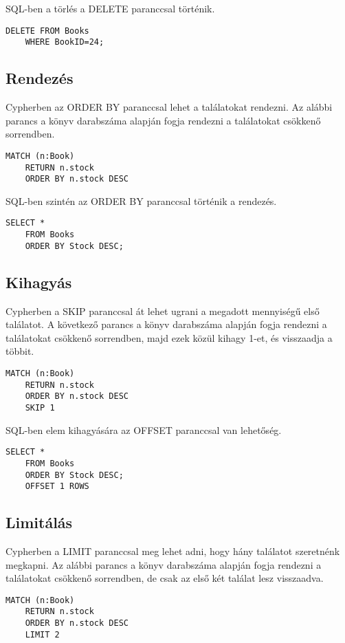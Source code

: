 \bigskip

\noindent SQL-ben a törlés a DELETE paranccsal történik.
\begin{lstlisting}[columns=fullflexible]
    DELETE FROM Books 
    WHERE BookID=24;
\end{lstlisting}

\subsection{Rendezés}
Cypherben az ORDER BY paranccsal lehet a találatokat rendezni. Az alábbi parancs a könyv darabszáma alapján fogja rendezni a találatokat csökkenő sorrendben.
\begin{lstlisting}[columns=fullflexible]
    MATCH (n:Book) 
    RETURN n.stock 
    ORDER BY n.stock DESC
\end{lstlisting}

\bigskip

\noindent SQL-ben szintén az ORDER BY paranccsal történik a rendezés.

\begin{lstlisting}[columns=fullflexible]
    SELECT * 
    FROM Books 
    ORDER BY Stock DESC;
\end{lstlisting}

\subsection{Kihagyás}
Cypherben a SKIP paranccsal át lehet ugrani a megadott mennyiségű első találatot. A következő parancs a könyv darabszáma alapján fogja rendezni a találatokat csökkenő sorrendben, majd ezek közül kihagy 1-et, és visszaadja a többit.
\begin{lstlisting}[columns=fullflexible]
    MATCH (n:Book) 
    RETURN n.stock 
    ORDER BY n.stock DESC
    SKIP 1
\end{lstlisting}

\noindent SQL-ben elem kihagyására az OFFSET paranccsal van lehetőség.

\begin{lstlisting}[columns=fullflexible]
    SELECT * 
    FROM Books 
    ORDER BY Stock DESC;
    OFFSET 1 ROWS
\end{lstlisting}

\subsection{Limitálás}
Cypherben a LIMIT paranccsal meg lehet adni, hogy hány találatot szeretnénk megkapni. Az alábbi parancs a könyv darabszáma alapján fogja rendezni a találatokat csökkenő sorrendben, de csak az első két találat lesz visszaadva.
\begin{lstlisting}[columns=fullflexible]
    MATCH (n:Book) 
    RETURN n.stock 
    ORDER BY n.stock DESC
    LIMIT 2
\end{lstlisting}

